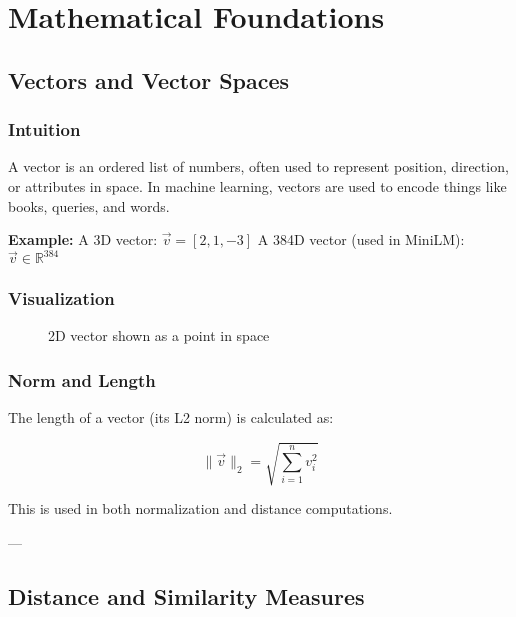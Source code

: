 \chapter{Mathematical Foundations}
\label{appendix:math}

\section{Vectors and Vector Spaces}
\label{sec:math-vectors}

\subsection*{Intuition}

A vector is an ordered list of numbers, often used to represent position, direction, or attributes in space. In machine learning, vectors are used to encode things like books, queries, and words.

\textbf{Example:} A 3D vector: $\vec{v} = [2, 1, -3]$  
A 384D vector (used in MiniLM): $\vec{v} \in \mathbb{R}^{384}$

\subsection*{Visualization}

\begin{figure}[H]
\centering
{}
\caption{2D vector shown as a point in space}
\label{fig:vector-visual}
\end{figure}

\subsection*{Norm and Length}

The length of a vector (its L2 norm) is calculated as:

\[
\|\vec{v}\|_2 = \sqrt{\sum_{i=1}^n v_i^2}
\]

This is used in both normalization and distance computations.

---

\section{Distance and Similarity Measures}
\label{sec:math-distance}

